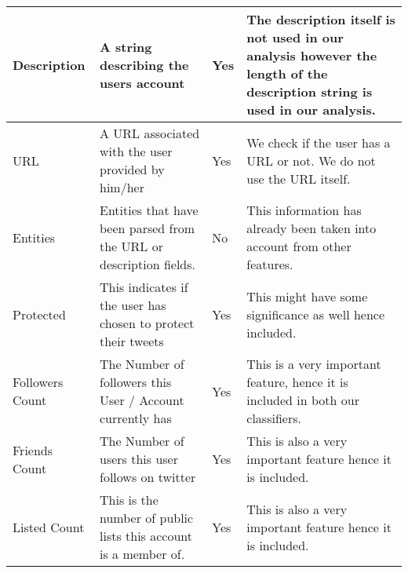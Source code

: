 \begin{landscape}
\begin{longtable}{|C{1.00in}|C{2.50in}|C{.60in}|C{5.00in}|}
\hline    
Description & A string describing the users account                                                                                          & Yes         & The description itself is not used in our analysis however the length of the description string is used in our analysis.                                                                         \\
\hline    
URL  & A URL associated with the user provided by him/her                                                                             & Yes         & We check if the user has a URL or not. We do not use the URL itself.                                                                                                                              \\
\hline    
Entities  & Entities that have been parsed from the URL or description fields.                                                             & No          & This information has already been taken into account from other features.                                                                                                                        \\
\hline    
Protected & This indicates if the user has chosen to protect their tweets                                                                  & Yes         & This might have some significance as well hence included.                                                                                                                                        \\
\hline    
Followers Count  & The Number of followers this User / Account currently has                                                                      & Yes         & This is a very important feature, hence it is included in both our classifiers.                                                                                                                  \\
\hline    
Friends Count & The Number of users this user follows on twitter                                                                               & Yes         & This is also a very important feature hence it is included.                                                                                                                                      \\
\hline    
Listed Count                       & This is the number of public lists this account is a member of.                                                                & Yes         & This is also a very important feature hence it is included.                                                                                                                                      \\

\end{longtable}
\end{landscape}
